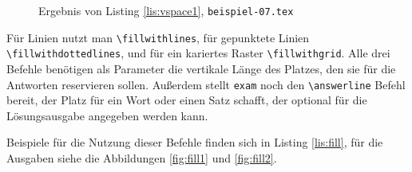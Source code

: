 \begin{figure}[b]
\caption{Ergebnis von Listing \ref{lis:vspace1}, \texttt{beispiel-07.tex}}\label{fig:vspace1}
\end{figure}

Für Linien nutzt man \texttt{\textbackslash fillwithlines}, für gepunktete Linien \texttt{\textbackslash fillwithdottedlines}, und für ein kariertes Raster \texttt{\textbackslash fillwithgrid}. 
Alle drei Befehle benötigen als Parameter die vertikale Länge des Platzes, den sie für die Antworten reservieren sollen. 
Außerdem stellt \texttt{exam} noch den \texttt{\textbackslash answerline} Befehl bereit, der Platz für ein Wort oder einen Satz schafft, der optional für die Lösungsausgabe angegeben werden kann.

Beispiele für die Nutzung dieser Befehle finden sich in Listing \ref{lis:fill}, für die Ausgaben siehe die Abbildungen \ref{fig:fill1} und \ref{fig:fill2}. 

